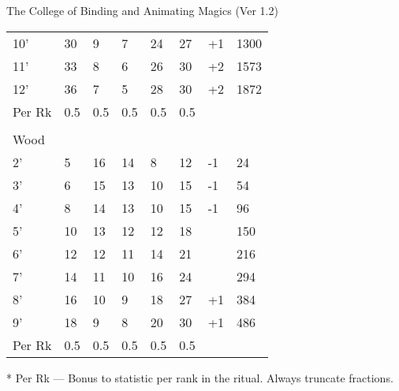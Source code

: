 \begin{Chapter}{The College of Binding and Animating Magics (Ver 1.2)}
\begin{small}
\begin{tabularx}{\columnwidth}{llllllll}
10’ 	& 30	& 9	& 7	& 24	& 27	& +1	& 1300 \\
11’ 	& 33	& 8	& 6	& 26	& 30	& +2	& 1573 \\
12’ 	& 36	& 7	& 5	& 28	& 30	& +2	& 1872 \\
Per Rk	& 0.5	& 0.5	& 0.5	& 0.5	& 0.5	&	& \\
 	& 	& 	& 	& 	& 	& 	& \\
\multicolumn{8}{l}{Wood} \\
2’ 	& 5	& 16	& 14	& 8	& 12	& -1	& 24 \\
3’ 	& 6	& 15	& 13	& 10	& 15	& -1	& 54 \\
4’ 	& 8	& 14	& 13	& 10	& 15	& -1	& 96 \\
5’ 	& 10	& 13	& 12	& 12	& 18	& 	& 150 \\
6’ 	& 12	& 12	& 11	& 14	& 21	& 	& 216 \\
7’ 	& 14	& 11	& 10	& 16	& 24	& 	& 294 \\
8’ 	& 16	& 10	& 9	& 18	& 27	& +1	& 384 \\
9’ 	& 18	& 9	& 8	& 20	& 30	& +1	& 486 \\
Per Rk	& 0.5	& 0.5	& 0.5	& 0.5	& 0.5	&	& \\
\end{tabularx}
\end{small}

* Per Rk — Bonus to statistic per rank in the ritual.  
Always truncate fractions. 
\end{Chapter}
